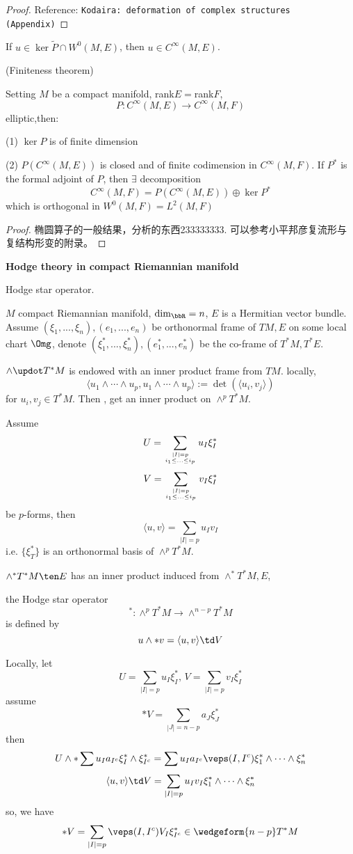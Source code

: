 \begin{proof}
Reference: \verb"Kodaira: deformation of complex structures (Appendix)"
\end{proof}

\begin{cor}
If $u\in\ker\tilde{P}\cap W^0(M,E)$, then $u\in C^\infty(M,E)$.
\end{cor}

\begin{lemma}(Finiteness theorem)

Setting $M$ be a compact manifold, rank$E=$rank$F$,
$$P:C^\infty(M,E)\to C^\infty(M,F)$$
elliptic,then:

(1) $\ker P$ is of finite dimension

(2) $P(C^\infty(M,E))$ is closed and of finite codimension in $C^\infty(M,F)$.
If $P^*$ is the formal adjoint of $P$, then $\exists$ decomposition
$$C^\infty(M,F)=P(C^\infty(M,E))\oplus\ker P^*$$
which is orthogonal in $W^0(M,F)=L^2(M,F)$
\end{lemma}
\begin{proof}
椭圆算子的一般结果，分析的东西233333333.
可以参考小平邦彦复流形与复结构形变的附录。
\end{proof}

\textbf{Hodge theory in compact Riemannian manifold}

Hodge star operator.

$M$ compact Riemannian manifold, $\dim_{\bbR}=n$, $E$ is a Hermitian vector bundle.
Assume $(\xi_1,...,\xi_n),(e_1,...,e_n)$ be orthonormal frame of $TM, E$
on some local chart $\Omg$, denote
$(\xi_1^*,...,\xi_n^*),(e_1^*,...,e_n^*)$ be the co-frame of
$T^*M,T^*E$.

$\wedge\updot T^*M$ is endowed with an inner product frame from $TM$.
locally,
$$\langle u_1\wedge\cdots\wedge u_p,
          u_1\wedge\cdots\wedge u_p\rangle
:=\det(\langle u_i,v_j\rangle)
$$
for $u_i,v_j\in T^*M$. Then , get an inner product on $\wedge^pT^*M$.

Assume
$$U=\sum_{|I|=p\atop i_1\leq...\leq i_p}
  u_I\xi_I^*
$$
$$V=\sum_{|I|=p\atop i_1\leq...\leq i_p}
  v_I\xi_I^*
$$
be $p$-forms, then
$$\langle u,v\rangle=\sum_{|I|=p}u_Iv_I$$
i.e. $\{\xi^*_T\}$ is an orthonormal basis of $\wedge^pT^*M$.

$\wedge^*T^*M\ten E$ has an inner product induced from $\wedge^*T^*M,E$,

\begin{definition}
the Hodge star operator
$$^*:\wedge^pT^*M\to\wedge^{n-p}T^*M$$
is defined by
$$u\wedge*v=\langle u,v\rangle\td V$$
\end{definition}
Locally, let
$$U=\sum_{|I|=p}u_I\xi_I^*,\,V=\sum_{|I|=p}v_I\xi_I^*$$
assume
$$*V=\sum_{|J|=n-p}a_J\xi_J^*$$
then
$$U\wedge*\sum u_I a_{I^c}\xi_I^*\wedge\xi_{I^c}^*
=\sum u_Ia_{I^c}\veps(I,I^c)\xi_1^*\wedge\cdots\wedge\xi_n^*
$$
$$
  \langle u,v\rangle\td V=\sum_{|I|=p}u_Iv_I\xi_1^*\wedge\cdots\wedge\xi_n^*
$$
so, we have
$$
  *V=\sum_{|I|=p}\veps(I,I^c)V_I\xi_{I^c}^*
\in \wedgeform{n-p}T^*M
$$

